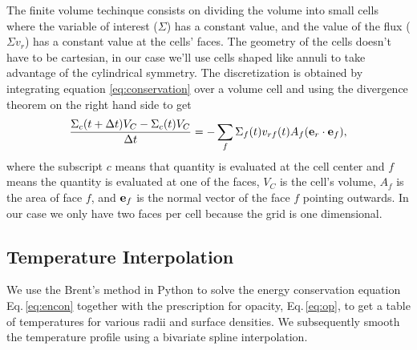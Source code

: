 \documentclass{article}
\begin{document}
The finite volume techinque consists on dividing the volume into small cells where the variable of interest ($\Sigma$) has a constant value,
and the value of the flux ($\Sigma v_r$) has a constant value at the cells' faces. The geometry of the cells doesn't have to be cartesian, in
our case we'll use cells shaped like annuli to take advantage of the cylindrical symmetry.
The discretization is obtained by integrating equation \ref{eq:conservation} over a volume cell and using the divergence theorem on the
right hand side to get
\begin{equation} \label{eq:discretization}
\frac{\Sigma_c(t+\Delta t) V_C - \Sigma_c(t) V_C}{\Delta t} =
-\sum_{f} \Sigma_{f}(t) v_{rf}(t) A_{f} (\bold{e}_r \cdot \bold{e}_{f}),
\end{equation}
where the subscript $c$ means that quantity is evaluated at the cell center and $f$ means the quantity is evaluated at one of the faces,
$V_C$ is the cell's volume, $A_f$ is the area of face $f$, and $\bold{e}_{f}$ is the normal vector of the face $f$ pointing outwards.
In our case we only have two faces per cell because the grid is one 
dimensional.

\subsection{Temperature Interpolation}
We use the Brent's method in Python to solve the energy conservation equation Eq.\,\ref{eq:encon} together with the prescription for opacity, Eq.\,\ref{eq:op}, to get a table of temperatures for various radii and surface densities. We subsequently smooth the temperature profile using a bivariate spline interpolation. 
\end{document}
